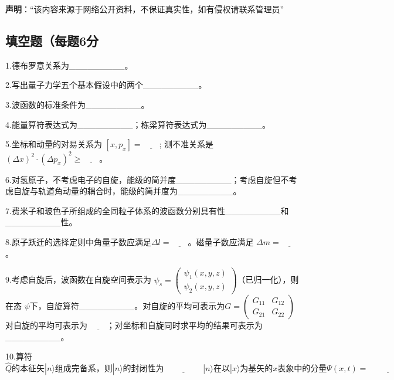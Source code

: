 
\textbf{声明}：“该内容来源于网络公开资料，不保证真实性，如有侵权请联系管理员”

\subsection{填空题（每题6分}

1.德布罗意关系为_________。

2.写出量子力学五个基本假设中的两个_________。

3.波函数的标准条件为_________。

4.能量算符表达式为_________；栋梁算符表达式为_________。

5.坐标和动量的对易关系为 $[x, p_x] = \underline{\quad\quad}$;
          测不准关系是 $(\Delta x)^2 \cdot (\Delta p_x)^2 \geq \underline{\quad\quad}$。

6.对氢原子，不考虑电子的自旋，能级的简并度_________；考虑自旋但不考虑自旋与轨道角动量的耦合时，能级的简并度为_________。

7.费米子和玻色子所组成的全同粒子体系的波函数分别具有性_________和_________性。

8.原子跃迁的选择定则中角量子数应满足$\Delta l = \underline{\quad\quad}$。磁量子数应满足 $\Delta m = \underline{\quad\quad}$。

9.考虑自旋后，波函数在自旋空间表示为 $\psi_s = \begin{pmatrix} \psi_1(x, y, z) \\ \psi_2(x, y, z) \end{pmatrix}$（已归一化），则在态 $\psi$下，自旋算符_________。对自旋的平均可表示为$G = \begin{pmatrix} G_{11} & G_{12} \\ G_{21} & G_{22} \end{pmatrix}$ 对自旋的平均可表示为 $\underline{\quad\quad}$；对坐标和自旋同时求平均的结果可表示为_________。

10.算符$\hat{Q}\text{的本征矢}|n\rangle \text{组成完备系，则}|n\rangle \text{的封闭性为} \underline{\hspace{2cm}}
|n\rangle \text{在以}|x\rangle \text{为基矢的} x \text{表象中的分量}\Psi(x,t)=\underline{\hspace{2cm}}$

